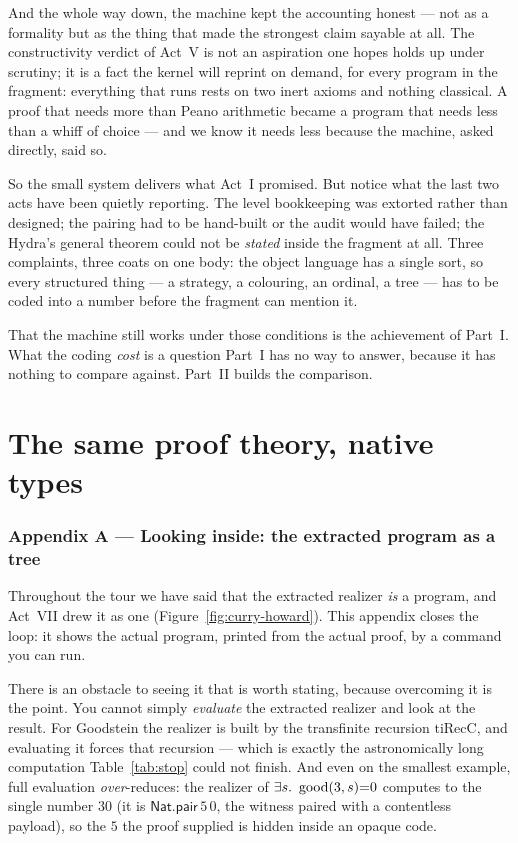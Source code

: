 \documentclass[11pt]{article}
\begin{document}
And the whole way down, the machine kept the accounting honest --- not as a
formality but as the thing that made the strongest claim sayable at all. The
constructivity verdict of Act~V is not an aspiration one hopes holds up under
scrutiny; it is a fact the kernel will reprint on demand, for every program in
the fragment: everything that runs rests on two inert axioms and nothing
classical. A proof that needs more than Peano arithmetic became a program that
needs less than a whiff of choice --- and we know it needs less because the
machine, asked directly, said so.

So the small system delivers what Act~I promised. But notice what the last two
acts have been quietly reporting. The level bookkeeping was extorted rather
than designed; the pairing had to be hand-built or the audit would have failed;
the Hydra's general theorem could not be \emph{stated} inside the fragment at
all. Three complaints, three coats on one body: the object language has a
single sort, so every structured thing --- a strategy, a colouring, an ordinal,
a tree --- has to be coded into a number before the fragment can mention it.

That the machine still works under those conditions is the achievement of
Part~I. What the coding \emph{cost} is a question Part~I has no way to answer,
because it has nothing to compare against. Part~II builds the comparison.

\part{The same proof theory, native types}



\appendix
\section{Appendix A --- Looking inside: the extracted program as a tree}
\label{app:xray}

Throughout the tour we have said that the extracted realizer \emph{is} a
program, and Act~VII drew it as one (Figure~\ref{fig:curry-howard}). This
appendix closes the loop: it shows the actual program, printed from the actual
proof, by a command you can run.

There is an obstacle to seeing it that is worth stating, because overcoming it is
the point. You cannot simply \emph{evaluate} the extracted realizer and look at
the result. For Goodstein the realizer is built by the transfinite recursion
$\mathrm{tiRecC}$, and evaluating it forces that recursion --- which is exactly
the astronomically long computation Table~\ref{tab:stop} could not finish. And
even on the smallest example, full evaluation \emph{over}-reduces: the realizer of
$\exists s.\ \operatorname{good}(3,s){=}0$ computes to the single number $30$ (it is
$\mathsf{Nat.pair}\,5\,0$, the witness paired with a contentless payload), so the
$5$ the proof supplied is hidden inside an opaque code.
\end{document}
